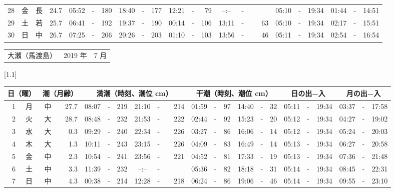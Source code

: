 \documentclass[12pt,a4j]{jsarticle}
\begin{document}
\begin{table}[htbp]
\begin{center}
{\begin{tabular}{|rc|cr|ccrccr|ccrccr|ccc|ccc|}
28 & 金 & 長 & 24.7 &  05:52 &-& 180 &  18:40 &-& 177 &  12:21 &-&  79 &  --:-- &-&~~~~~ & 05:10 & -& 19:34 & 01:44 & -& 14:51 \\
29 & 土 & 若 & 25.7 &  06:41 &-& 192 &  19:37 &-& 190 &  00:14 &-& 106 &  13:11 &-&  63 & 05:10 & -& 19:34 & 02:17 & -& 15:51 \\
30 & 日 & 中 & 26.7 &  07:25 &-& 206 &  20:26 &-& 203 &  01:10 &-& 103 &  13:56 &-&  46 & 05:11 & -& 19:34 & 02:54 & -& 16:54 \\
   \hline
   \end{tabular}}
   \end{center}
\end{table}
\newpage
 \begin{table}[htbp]
 \begin{center}
 \begin{tabular}{lcc}
 \LARGE{大瀬（馬渡島）}  & \large{2019 年} & \large{ 7 月} \\
 \end{tabular}
 \end{center}
 \begin{center}
    \scalebox{0.7}[1.1]{
    \begin{tabular}{|rc|cr|ccrccr|ccrccr|ccc|ccc|}
    \hline
    \multicolumn{2}{|c|}{日（曜）} & \multicolumn{2}{c|}{潮（月齢）} & \multicolumn{6}{c|}{満潮（時刻、潮位 cm）} & \multicolumn{6}{c|}{干潮（時刻、潮位 cm）} & \multicolumn{3}{c|}{日の出−入} &  \multicolumn{3}{c|}{月の出−入}\\
 \hline
 1 & 月 & 中 & 27.7 &  08:07 &-& 219 &  21:10 &-& 214 &  01:59 &-&  97 &  14:40 &-&  32 & 05:11 & -& 19:34 & 03:37 & -& 17:58 \\
 2 & 火 & 大 & 28.7 &  08:48 &-& 232 &  21:53 &-& 222 &  02:44 &-&  92 &  15:23 &-&  20 & 05:12 & -& 19:34 & 04:27 & -& 19:02 \\
 3 & 水 & 大 &  0.3 &  09:29 &-& 240 &  22:34 &-& 226 &  03:27 &-&  86 &  16:06 &-&  14 & 05:12 & -& 19:34 & 05:24 & -& 20:03 \\
 4 & 木 & 大 &  1.3 &  10:11 &-& 243 &  23:15 &-& 226 &  04:09 &-&  83 &  16:49 &-&  14 & 05:13 & -& 19:34 & 06:27 & -& 20:58 \\
 5 & 金 & 中 &  2.3 &  10:54 &-& 241 &  23:56 &-& 221 &  04:52 &-&  81 &  17:33 &-&  19 & 05:13 & -& 19:34 & 07:36 & -& 21:48 \\
 6 & 土 & 中 &  3.3 &  11:39 &-& 232 &  --:-- &-&~~~~~ &  05:36 &-&  82 &  18:18 &-&  31 & 05:14 & -& 19:34 & 08:45 & -& 22:31 \\
 7 & 日 & 中 &  4.3 &  00:38 &-& 214 &  12:28 &-& 218 &  06:24 &-&  86 &  19:06 &-&  46 & 05:14 & -& 19:34 & 09:55 & -& 23:10 \\

\end{tabular}}
\end{center}
\end{table}
\end{document}
